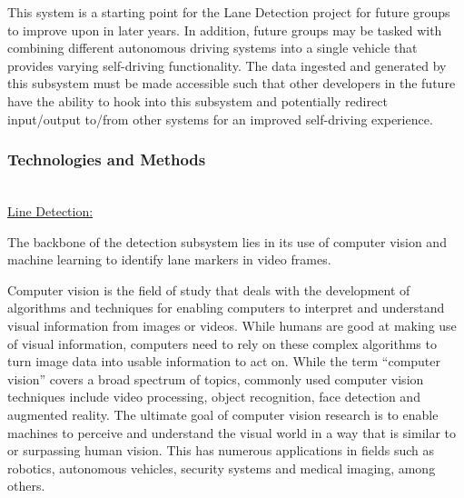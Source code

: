 \documentclass[titlepage,draft]{article}
\begin{document}
\begin{itemize}
	      This system is a starting point for the Lane Detection project for future groups to improve upon in later years.
	      In addition, future groups may be tasked with combining different autonomous driving systems into a single vehicle that provides
	      varying self-driving functionality.
	      The data ingested and generated by this subsystem must be made accessible such that other developers in the future have the
	      ability to hook into this subsystem and potentially redirect input/output to/from other systems for an improved self-driving
	      experience.
\end{itemize}


\subsubsection{Technologies and Methods}
~\\
\underline{Line Detection:}

The backbone of the detection subsystem lies in its use of computer vision and machine learning to identify lane markers in video
frames.

Computer vision is the field of study that deals with the development of algorithms and techniques for enabling computers
to interpret and understand visual information from images or videos.
While humans are good at making use of visual information, computers need to rely on these complex algorithms to turn image
data into usable information to act on.
While the term ``computer vision'' covers a broad spectrum of topics, commonly used computer vision techniques include video
processing, object recognition, face detection and augmented reality.
The ultimate goal of computer vision research is to enable machines to perceive and understand the visual world in a way that
is similar to or surpassing human vision.
This has numerous applications in fields such as robotics, autonomous vehicles, security systems and medical imaging, among
others.
\end{document}
